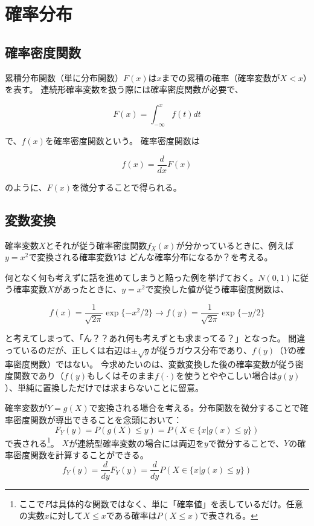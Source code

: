 \documentclass[a4j,12pt]{jreport}
\begin{document}
\chapter{確率分布}


\section{確率密度関数}

累積分布関数（単に分布関数）$F(x)$は$x$までの累積の確率（確率変数が$X<x$）を表す。
連続形確率変数を扱う際には確率密度関数が必要で、

\begin{equation}
  F(x)=\int_{-\infty}^x f(t) dt
\end{equation}

で、$f(x)$を確率密度関数という。
確率密度関数は

\begin{equation}
  f(x) = \frac{d}{dx}F(x)
\end{equation}

のように、$F(x)$を微分することで得られる。


\section{変数変換}

確率変数$X$とそれが従う確率密度関数$f_X(x)$が分かっているときに、例えば$y=x^2$で変換される確率変数$Y$は
どんな確率分布になるか？を考える。

何となく何も考えずに話を進めてしまうと陥った例を挙げておく。$N(0,1)$に従う確率変数$X$があったときに、$y=x^2$で変換した値が従う確率密度関数は、

\begin{equation}
  f(x) = \frac{1}{\sqrt{2\pi}}\exp \{-x^2/2\} \to f(y) = \frac{1}{\sqrt{2\pi}}\exp \{-y/2\}
\end{equation}

と考えてしまって、「ん？？あれ何も考えずとも求まってる？」となった。
間違っているのだが、正しくは右辺は$\pm \sqrt{y}$が従うガウス分布であり、$f(y)$（$Y$の確率密度関数）ではない。
今求めたいのは、変数変換した後の確率変数が従う密度関数であり（$f(y)$もしくはそのまま$f(\cdot)$を使うとややこしい場合は$g(y)$）、単純に置換しただけでは求まらないことに留意。

確率変数が$Y=g(X)$で変換される場合を考える。分布関数を微分することで確率密度関数が導出できることを念頭において：
\begin{equation}
  F_Y(y) = P(g(X) \leq y) = P(X \in \{x|g(x) \leq y\})
\end{equation}
で表される\footnote{ここで$P$は具体的な関数ではなく、単に「確率値」を表しているだけ。任意の実数$x$に対して$X\leq x$である確率は$P(X\leq x)$で表される。}。
$X$が連続型確率変数の場合には両辺を$y$で微分することで、$Y$の確率密度関数を計算することができる。
\begin{equation}
  f_Y(y) = \frac{d}{dy}F_Y(y) = \frac{d}{dy}P(X \in \{x|g(x) \leq y\})
\end{equation}
\end{document}
